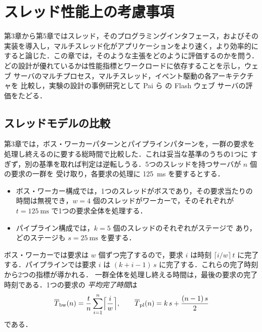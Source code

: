 \documentclass[../main.tex]{subfiles}
\begin{document}
\chapter{スレッド性能上の考慮事項}

第3章から第5章ではスレッド，そのプログラミングインタフェース，およびその
実装を導入し，マルチスレッド化がアプリケーションをより速く，より効率的に
すると論じた．この章では，そのような主張をどのように評価するのかを問う．
どの設計が優れているかは性能指標とワークロードに依存することを示し，ウェブ
サーバのマルチプロセス，マルチスレッド，イベント駆動の各アーキテクチャを
比較し，実験の設計の事例研究として Pai ら \cite{pai1999} の Flash ウェブ
サーバの評価をたどる．

\section{スレッドモデルの比較}
\label{sec:l06-compare}

第3章では，ボス・ワーカーパターンとパイプラインパターンを，一群の要求を
処理し終えるのに要する総時間で比較した．これは妥当な基準のうちの1つに
すぎず，別の基準を取れば判定は逆転しうる．5つのスレッドを持つサーバが $n$ 個の要求の一群を
受け取り，各要求の処理に \SI{125}{\milli\second} を要するとする．
\begin{itemize}
  \item ボス・ワーカー構成では，1つのスレッドがボスであり，その要求当たりの
    時間は無視でき，$w = 4$ 個のスレッドがワーカーで，そのそれぞれが
    $t = \SI{125}{\milli\second}$ で1つの要求全体を処理する．
  \item パイプライン構成では，$k = 5$ 個のスレッドのそれぞれがステージで
    あり，どのステージも $s = \SI{25}{\milli\second}$ を要する．
\end{itemize}
ボス・ワーカーでは要求は $w$ 個ずつ完了するので，要求 $i$ は時刻
$\lceil i/w \rceil\, t$ に完了する．パイプラインでは要求 $i$ は
$(k + i - 1)\, s$ に完了する．これらの完了時刻から2つの指標が導かれる．%
%
一群全体を処理し終える時間は，最後の要求の完了時刻である．1つの要求の
\emph{平均完了時間}は
\begin{equation}
  \overline{T}_{\mathrm{bw}}(n) = \frac{t}{n} \sum_{i=1}^{n}
    \Bigl\lceil \frac{i}{w} \Bigr\rceil ,
  \qquad
  \overline{T}_{\mathrm{pl}}(n) = k\, s + \frac{(n-1)\, s}{2}
  \label{eq:l06-mean-completion}
\end{equation}
である．
\end{document}
